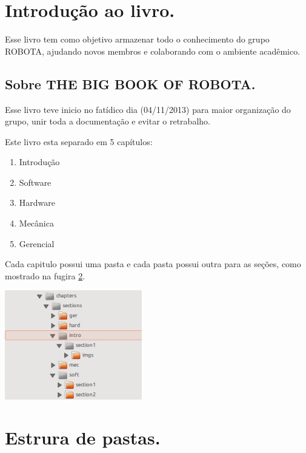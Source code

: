 \section{Introduç\~ao ao livro.} %
Esse livro tem como objetivo armazenar todo o conhecimento do grupo ROBOTA,
ajudando novos membros e colaborando com o ambiente acadêmico.

\subsection{Sobre THE BIG BOOK OF ROBOTA.}	%
Esse livro teve inicio no fatídico dia (04/11/2013) para maior organizaç\~ao do grupo,
unir toda a documentaç\~ao e evitar o retrabalho.

Este livro esta separado em 5 capítulos:

\begin{enumerate}
\item Introdução
\item Software
\item Hardware
\item Mecânica
\item Gerencial
\end{enumerate}

Cada capitulo possui uma pasta e cada pasta possui outra para as seções, como mostrado na fugira \ref{estrutura}.


\begin{center}
\center
\includegraphics[width=6cm]{./include/chapters/sections/intro/section1/imgs/estrutura.png}

\section{Estrura de pastas.}
\label{estrutura}
\end{center}

